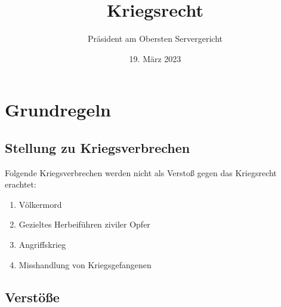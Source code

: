 \documentclass{article}
\title{Kriegsrecht}
\author{Präsident am Obersten Servergericht}
\date{19. März 2023}
\begin{document}
\maketitle
\newpage
\section{Grundregeln}
\subsection{Stellung zu Kriegsverbrechen}
Folgende Kriegsverbrechen werden nicht als Verstoß gegen das Kriegsrecht erachtet:
\begin{enumerate}
    \item Völkermord
    \item Gezieltes Herbeiführen ziviler Opfer
    \item Angriffskrieg
    \item Misshandlung von Kriegsgefangenen
\end{enumerate}
\subsection{Verstöße}
\end{document}
